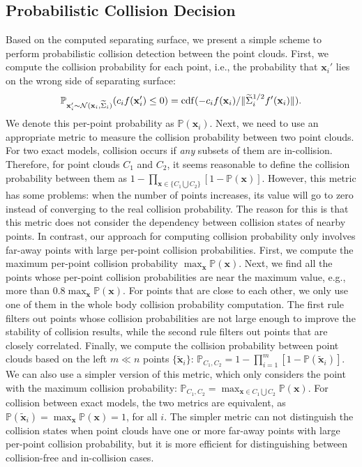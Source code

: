 \subsection{Probabilistic Collision Decision}
\label{sec:7:algorithm:4}

Based on the computed separating surface, we present a simple scheme to perform probabilistic collision detection between the point clouds.
First, we compute the collision probability for each point, i.e., the probability that $\mathbf x_i'$ lies on the wrong side of separating surface:
\begin{equation}
\label{eq:7:perpointcolprob}
\mathbb{P}_{\mathbf x_i' \sim \mathcal{N}(\mathbf x_i, \widetilde{\Sigma}_i)} (c_i f(\mathbf x_i') \leq 0) =
\erf(-c_i f(\mathbf x_i) / \|\widetilde{\Sigma}_i^{1/2} f'(\mathbf x_i)\|).
\end{equation}
We denote this per-point probability as $\mathbb{P}(\mathbf x_i)$.
Next, we need to use an appropriate metric to measure the collision probability between two point clouds.
For two exact models, collision occurs if \emph{any} subsets of them are in-collision. Therefore, for point clouds $C_1$ and $C_2$, it seems reasonable to define the collision probability between them as $1 - \prod_{\mathbf x \in \{C_1 \bigcup C_2\}} [1 - \mathbb{P}(\mathbf x)]$. However, this metric has some problems: when the number of points increases, its value will go to zero instead of converging to the real collision probability. The reason for this is that this metric does not consider the dependency between collision states of nearby points.
In contrast, our approach for computing collision probability only involves far-away points with large per-point collision probabilities.
First, we compute the maximum per-point collision probability $\max_{\mathbf x} \mathbb{P}(\mathbf x)$. Next, we find all the points whose per-point collision probabilities are near the maximum value, e.g., more than $0.8 \max_{\mathbf x} \mathbb{P}(\mathbf x)$. For points that are close to each other, we only use one of them in the whole body collision probability computation. The first rule filters out points whose collision probabilities are not large enough to improve the stability of collision results, while the second rule filters out points that are closely correlated. Finally, we compute the collision probability between point clouds based on the left $m \ll n$ points $\{\tilde{\mathbf x}_i\}$: $\mathbb{P}_{C_1, C_2} = 1 - \prod_{i=1}^m [1 - \mathbb{P}(\tilde{\mathbf x}_i)]$. We can also use a simpler version of this metric, which only considers the point with the maximum collision probability: $\mathbb{P}_{C_1, C_2} = \max_{\mathbf x \in C_1 \bigcup C_2} \mathbb{P}(\mathbf x)$. For collision between exact models, the two metrics are equivalent, as $\mathbb{P}(\tilde{\mathbf x}_i) = \max_{\mathbf x} \mathbb{P}(\mathbf x) = 1$,
for all $i$. The simpler metric can not distinguish the collision states when point clouds have one or more
far-away points with large per-point collision probability, but it is more efficient for distinguishing between collision-free and in-collision cases.


